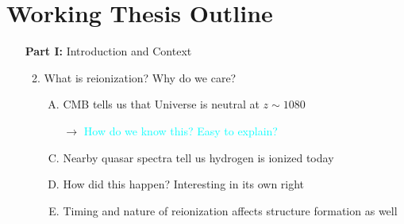 \documentclass[11pt]{article}
\begin{document}
\section*{Working Thesis Outline}

\begin{enumerate}
\item [{\bf Part I:}] Introduction and Context
\begin{enumerate}[1.]
\item[]
\item What is reionization? Why do we care?
\begin{enumerate}[A.]
\item CMB tells us that Universe is neutral at $z \sim 1080$
\item [$\to$] \textcolor{cyan}{How do we know this? Easy to explain?}
\item Nearby quasar spectra tell us hydrogen is ionized today
\item How did this happen? Interesting in its own right
\item Timing and nature of reionization affects structure formation as well
\end{enumerate}



\end{enumerate}
\end{enumerate}
\end{document}
